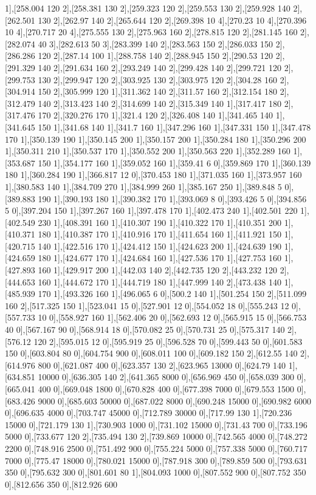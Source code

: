 {1],[258.004 120 2],[258.381 130 2],[259.323 120 2],[259.553 130 2],[259.928 140 2],[262.501 130 2],[262.97 140 2],[265.644 120 2],[269.398 10 4],[270.23 10 4],[270.396 10 4],[270.717 20 4],[275.555 130 2],[275.963 160 2],[278.815 120 2],[281.145 160 2],[282.074 40 3],[282.613 50 3],[283.399 140 2],[283.563 150 2],[286.033 150 2],[286.286 120 2],[287.14 100 1],[288.758 140 2],[288.945 150 2],[290.53 120 2],[291.329 140 2],[291.634 160 2],[293.249 140 2],[299.428 140 2],[299.721 120 2],[299.753 130 2],[299.947 120 2],[303.925 130 2],[303.975 120 2],[304.28 160 2],[304.914 150 2],[305.999 120 1],[311.362 140 2],[311.57 160 2],[312.154 180 2],[312.479 140 2],[313.423 140 2],[314.699 140 2],[315.349 140 1],[317.417 180 2],[317.476 170 2],[320.276 170 1],[321.4 120 2],[326.408 140 1],[341.465 140 1],[341.645 150 1],[341.68 140 1],[341.7 160 1],[347.296 160 1],[347.331 150 1],[347.478 170 1],[350.139 190 1],[350.145 200 1],[350.157 200 1],[350.284 180 1],[350.296 200 1],[350.311 210 1],[350.537 170 1],[350.552 200 1],[350.563 220 1],[352.289 160 1],[353.687 150 1],[354.177 160 1],[359.052 160 1],[359.41 6 0],[359.869 170 1],[360.139 180 1],[360.284 190 1],[366.817 12 0],[370.453 180 1],[371.035 160 1],[373.957 160 1],[380.583 140 1],[384.709 270 1],[384.999 260 1],[385.167 250 1],[389.848 5 0],[389.883 190 1],[390.193 180 1],[390.382 170 1],[393.069 8 0],[393.426 5 0],[394.856 5 0],[397.204 150 1],[397.267 160 1],[397.478 170 1],[402.473 240 1],[402.501 220 1],[402.549 230 1],[408.391 160 1],[410.307 190 1],[410.322 170 1],[410.351 200 1],[410.371 180 1],[410.387 170 1],[410.916 170 1],[411.654 160 1],[411.921 150 1],[420.715 140 1],[422.516 170 1],[424.412 150 1],[424.623 200 1],[424.639 190 1],[424.659 180 1],[424.677 170 1],[424.684 160 1],[427.536 170 1],[427.753 160 1],[427.893 160 1],[429.917 200 1],[442.03 140 2],[442.735 120 2],[443.232 120 2],[444.653 160 1],[444.672 170 1],[444.719 180 1],[447.999 140 2],[473.438 140 1],[485.939 170 1],[493.326 160 1],[496.065 6 0],[500.2 140 1],[501.254 150 2],[511.099 160 2],[517.325 150 1],[523.041 15 0],[527.901 12 0],[554.052 18 0],[555.243 12 0],[557.733 10 0],[558.927 160 1],[562.406 20 0],[562.693 12 0],[565.915 15 0],[566.753 40 0],[567.167 90 0],[568.914 18 0],[570.082 25 0],[570.731 25 0],[575.317 140 2],[576.12 120 2],[595.015 12 0],[595.919 25 0],[596.528 70 0],[599.443 50 0],[601.583 150 0],[603.804 80 0],[604.754 900 0],[608.011 100 0],[609.182 150 2],[612.55 140 2],[614.976 800 0],[621.087 400 0],[623.357 130 2],[623.965 13000 0],[624.79 140 1],[634.851 10000 0],[636.305 140 2],[641.365 8000 0],[656.969 450 0],[658.039 300 0],[665.041 400 0],[669.048 1800 0],[670.828 400 0],[677.398 7000 0],[679.553 1500 0],[683.426 9000 0],[685.603 50000 0],[687.022 8000 0],[690.248 15000 0],[690.982 6000 0],[696.635 4000 0],[703.747 45000 0],[712.789 30000 0],[717.99 130 1],[720.236 15000 0],[721.179 130 1],[730.903 1000 0],[731.102 15000 0],[731.43 700 0],[733.196 5000 0],[733.677 120 2],[735.494 130 2],[739.869 10000 0],[742.565 4000 0],[748.272 2200 0],[748.916 2500 0],[751.492 900 0],[755.224 5000 0],[757.338 5000 0],[760.717 7000 0],[775.47 18000 0],[780.021 15000 0],[787.918 300 0],[789.859 500 0],[793.631 350 0],[795.632 300 0],[801.601 80 1],[804.093 1000 0],[807.552 900 0],[807.752 350 0],[812.656 350 0],[812.926 600 }
